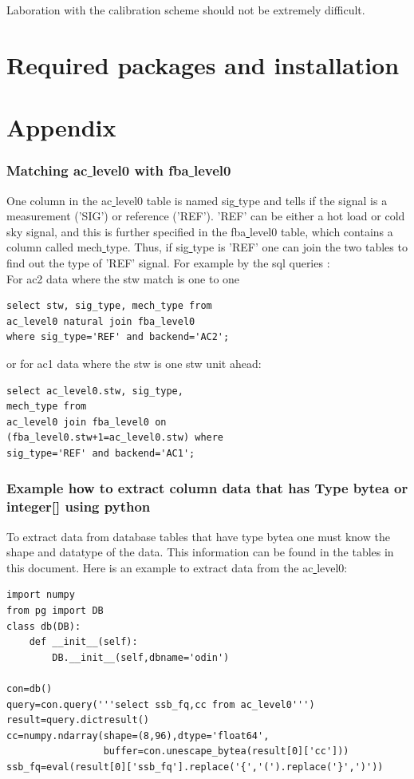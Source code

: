 \documentclass[12pt]{article}
\begin{document}
Laboration with the calibration scheme should not be extremely
difficult.
  
\section{Required packages and installation}


\section{Appendix}
\subsubsection*{Matching ac\underline{ }level0 with fba\underline{ }level0}
 One column in the ac\underline{ }level0
table is named sig\underline{ }type and tells if the signal is 
a measurement ('SIG') or reference ('REF').
'REF' can be either a hot load or cold sky signal, and this is
further specified in the fba\underline{ }level0 table,
which contains a column called mech\underline{ }type.
Thus, if sig\underline{ }type is 'REF' one can join the two
tables to find out the type of 'REF' signal.
For example by the sql queries :\\
For ac2 data where the stw match is one to one\\
\begin{verbatim}
select stw, sig_type, mech_type from 
ac_level0 natural join fba_level0 
where sig_type='REF' and backend='AC2';
\end{verbatim}
or for ac1 data where the stw is one stw unit ahead:
\begin{verbatim}
select ac_level0.stw, sig_type,
mech_type from 
ac_level0 join fba_level0 on 
(fba_level0.stw+1=ac_level0.stw) where 
sig_type='REF' and backend='AC1';
\end{verbatim}

\subsubsection*{Example how to extract column data that has Type bytea
or integer[] using python}
To extract data from database tables that have type bytea one must
know the shape and datatype of the data. This information
can be found in the tables in this document. Here is an example
to extract data from the ac\underline{ }level0: 

\begin{verbatim}
import numpy
from pg import DB
class db(DB):
    def __init__(self):
        DB.__init__(self,dbname='odin')

con=db()
query=con.query('''select ssb_fq,cc from ac_level0''')
result=query.dictresult()
cc=numpy.ndarray(shape=(8,96),dtype='float64',
                 buffer=con.unescape_bytea(result[0]['cc']))
ssb_fq=eval(result[0]['ssb_fq'].replace('{','(').replace('}',')'))
\end{verbatim}
\clearpage
\newpage
\end{document}
